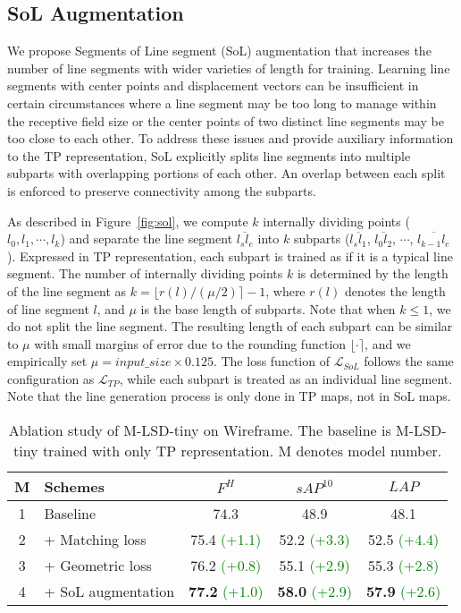 \documentclass[letterpaper]{article} \usepackage{aaai22}  \usepackage{times}  \usepackage{helvet}  \usepackage{courier}  \usepackage[hyphens]{url}  \usepackage{graphicx} \urlstyle{rm} \def\UrlFont{\rm}  \usepackage{natbib}  \usepackage{caption} \DeclareCaptionStyle{ruled}{labelfont=normalfont,labelsep=colon,strut=off} \frenchspacing  \setlength{\pdfpagewidth}{8.5in}  \setlength{\pdfpageheight}{11in}  \usepackage{algorithm}
\newcommand{\round}[1]{\ensuremath{\lfloor#1\rceil}}
\begin{document}
\subsection{SoL Augmentation}
We propose Segments of Line segment (SoL) augmentation that increases the number of line segments with wider varieties of length for training.
Learning line segments with center points and displacement vectors can be insufficient in certain circumstances where a line segment may be too long to manage within the receptive field size or the center points of two distinct line segments may be too close to each other.
To address these issues and provide auxiliary information to the TP representation, SoL explicitly splits line segments into multiple subparts with overlapping portions of each other.
An overlap between each split is enforced to preserve connectivity among the subparts.

As described in Figure~\ref{fig:sol}, we compute $k$ internally dividing points ($l_0, l_1, \cdots, l_k$) and separate the line segment $\overline{l_sl_e}$ into $k$ subparts ($\overline{l_sl_1}$, $\overline{l_0l_2}$, $\cdots$, $\overline{l_{k-1}l_e}$).
Expressed in TP representation, each subpart is trained as if it is a typical line segment.
The number of internally dividing points $k$ is determined by the length of the line segment as $k = \round{r(l)/(\mu/2)} - 1$, where $r(l)$ denotes the length of line segment $l$, and $\mu$ is the base length of subparts.
Note that when $k \leq 1$, we do not split the line segment.
The resulting length of each subpart can be similar to $\mu$ with small margins of error due to the rounding function \round{\cdot}, and we empirically set $\mu= input\_size \times 0.125$.
The loss function of $\mathcal L_{SoL}$ follows the same configuration as $\mathcal L_{TP}$, while each subpart is treated as an individual line segment.
Note that the line generation process is only done in TP maps, not in SoL maps.


\begin{table}[t!]
\centering
\begin{adjustbox}{width=1.0\columnwidth,center}
\begin{tabular}{clccc}
\toprule
M & Schemes                & $F^H$ & $sAP^{10}$ & $LAP$ \\
\midrule
1 & Baseline    &   74.3   & 48.9  &  48.1  \\
2 & + Matching loss  &   75.4 \textcolor{Green}{(+1.1)}  & 52.2 \textcolor{Green}{(+3.3)}  &  52.5 \textcolor{Green}{(+4.4)} \\
3 & + Geometric loss     &   76.2 \textcolor{Green}{(+0.8)}  & 55.1 \textcolor{Green}{(+2.9)} &   55.3 \textcolor{Green}{(+2.8)}  \\
4 & + SoL augmentation      &   \textbf{77.2} \textcolor{Green}{(+1.0)}  & \textbf{58.0} \textcolor{Green}{(+2.9)} &   \textbf{57.9} \textcolor{Green}{(+2.6)}  \\
\bottomrule
\end{tabular}
\end{adjustbox}
\caption{Ablation study of M-LSD-tiny on Wireframe. The baseline is M-LSD-tiny trained with only TP representation. M denotes model number.}
\label{table:ablation}
\end{table}
\end{document}
